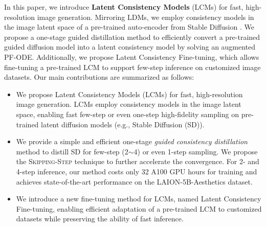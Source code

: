 \documentclass{article} %
\newcommand{\jian}[1]{\textcolor{red}{#1}}
\begin{document}

In this paper, we introduce \textbf{Latent Consistency Models} (LCMs) for fast, high-resolution image generation. Mirroring LDMs, we employ consistency models in the image latent space of a pre-trained auto-encoder from Stable Diffusion \citep{rombach2022high}.
We propose a one-stage guided distillation method to efficiently convert a pre-trained guided diffusion model into a latent consistency model by solving an augmented PF-ODE. Additionally, we propose Latent Consistency Fine-tuning, which allows fine-tuning a pre-trained LCM to support few-step inference on customized image datasets.
Our main contributions are summarized as follows:

\vspace{-2pt}\begin{itemize}[leftmargin=*, itemsep=1pt]
    \item We propose Latent Consistency Models (LCMs) for fast, high-resolution image generation.
    LCMs employ consistency models in the image latent space, enabling fast few-step or even one-step high-fidelity sampling on pre-trained latent diffusion models (e.g., Stable Diffusion (SD)). 
    \item  We provide a simple and efficient one-stage {\em guided consistency distillation} method to distill SD for few-step (2$\sim$4) or even 1-step sampling. 
    We propose the \textsc{Skipping-Step} technique to further accelerate the convergence.
    For 2- and 4-step inference, our method costs only 32 A100 GPU hours for training and 
    achieves state-of-the-art performance on the LAION-5B-Aesthetics dataset.
    \item We introduce a new fine-tuning method for LCMs, named Latent Consistency Fine-tuning, enabling efficient adaptation of a pre-trained LCM to customized datasets while preserving the ability of fast inference.
\end{itemize}
\end{document}
